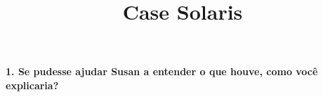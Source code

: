 \documentclass[12pt]{article}
\begin{document}
\title{Case Solaris}
\maketitle

\textbf{1. Se pudesse ajudar Susan a entender o que houve, como você explicaria?}
\end{document}
